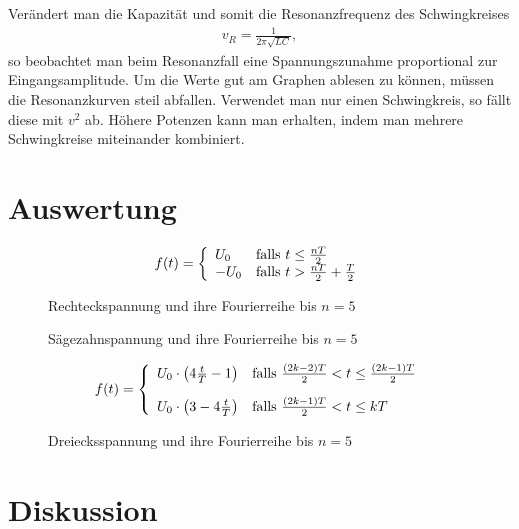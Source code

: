 Verändert man die Kapazität und somit die Resonanzfrequenz des Schwingkreises
\begin{align}
v_R=\frac{1}{2\pi\sqrt{LC}},
\end{align}
so beobachtet man beim Resonanzfall eine Spannungszunahme proportional zur Eingangsamplitude. Um die Werte gut am Graphen ablesen zu können, müssen die Resonanzkurven steil abfallen. Verwendet man nur einen Schwingkreis, so fällt diese mit $v^2$ ab. Höhere Potenzen kann man erhalten, indem man mehrere Schwingkreise miteinander kombiniert.

\section{Auswertung}
\begin{align*}			
f(t) =
\left\{
	\begin{array}{l l}
	U_0  & \text{falls } t \leq \frac{nT}{2}\\
	-U_0 & \text{falls } t > \frac{nT}{2}+\frac{T}{2}
	\end{array}
\right.
\end{align*}

\begin{figure}[H]
 
 \caption{Rechteckspannung und ihre Fourierreihe bis $n=5$}
 \label{pic_rechteckfourier}
\end{figure}


\begin{figure}[H]
 
 \caption{Sägezahnspannung und ihre Fourierreihe bis $n=5$}
 \label{pic_saegezahnfourier}
\end{figure}


\begin{align*}			
f(t) =
	\left\{
	\begin{array}{ll}
	U_0 \cdot \left( 4\frac{t}{T} - 1 \right)
	& \text{falls } \frac{(2k-2)T}{2} < t \leq \frac{(2k-1)T}{2}
	\vspace{10pt}
	\\
	U_0 \cdot \left( 3 - 4 \frac{t}{T} \right)
	& \text{falls } \frac{(2k-1)T}{2} < t \leq kT
	\end{array}
\right.
\end{align*}
				

\begin{figure}[H]
 
 \caption{Dreiecksspannung und ihre Fourierreihe bis $n=5$}
 \label{pic_dreieckfourier}
\end{figure}


\section{Diskussion}





